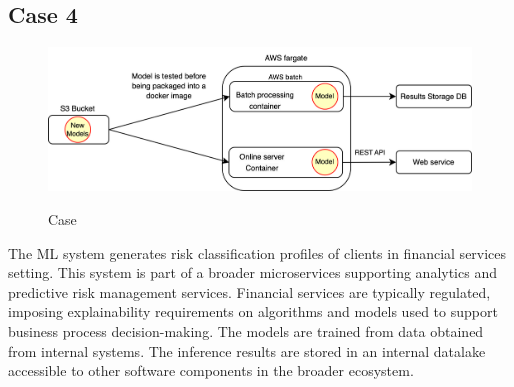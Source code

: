\subsection*{Case 4} %
\label{case: 4}
\DIFdelbegin %

\DIFdelend \begin{figure}[t]
\centering
\DIFdelbeginFL %
\DIFdelendFL \DIFaddbeginFL \includegraphics[width=\linewidth]{images/case4_deployment_process.png}
\DIFaddendFL \caption{Case \DIFdelbeginFL {}\DIFdelendFL \DIFaddbeginFL {}\DIFaddendFL }
\DIFdelbeginFL %
\DIFdelendFL \DIFaddbeginFL \label{fig: case4_deployment_process}
\DIFaddendFL \end{figure}
\DIFaddbegin 

\DIFaddend 

The ML system generates risk classification profiles of clients in financial services setting. This system is part of a broader microservices supporting analytics and predictive risk management services. Financial services are typically regulated, imposing explainability requirements on algorithms and models used to support business process decision-making. The models are trained from data obtained from internal systems. The inference results are stored in an internal datalake accessible to other software components in the broader ecosystem. 

